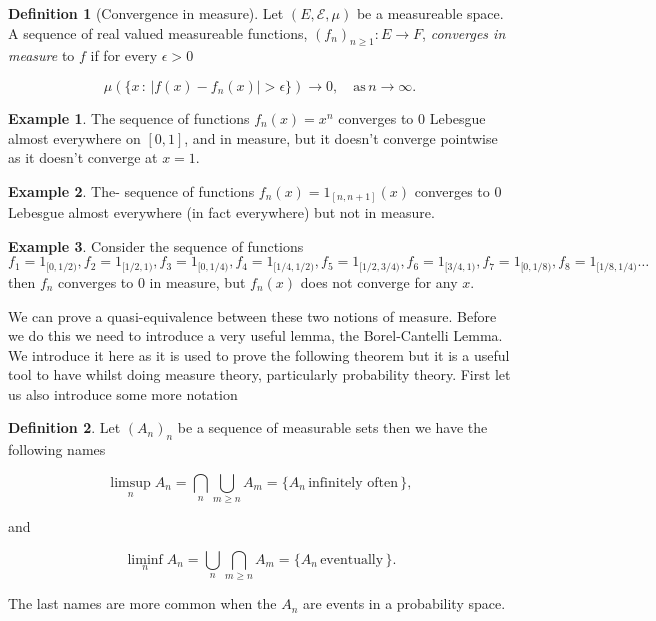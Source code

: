 \documentclass[
]{book}
\theoremstyle{definition}
\newtheorem{definition}{Definition}[chapter]
\theoremstyle{definition}
\newtheorem{example}{Example}[chapter]
\theoremstyle{definition}
\theoremstyle{definition}
\theoremstyle{remark}
\begin{document}
\begin{definition}[Convergence in measure]
Let \((E, \mathcal{E}, \mu)\) be a measureable space. A sequence of real valued measureable functions, \((f_n)_{n \geq 1}: E \rightarrow F\), \emph{converges in measure} to \(f\) if for every \(\epsilon > 0\)

\[ \mu \left( \{ x \, :\, |f(x) - f_n(x)| > \epsilon \} \right) \rightarrow 0, \quad \mbox{as}\, n \rightarrow \infty. \]
\end{definition}

\begin{example}
The sequence of functions \(f_n(x) = x^n\) converges to \(0\) Lebesgue almost everywhere on \([0,1]\), and in measure, but it doesn't converge pointwise as it doesn't converge at \(x=1\).
\end{example}

\begin{example}
The- sequence of functions \(f_n(x) = 1_{[n,n+1]}(x)\) converges to 0 Lebesgue almost everywhere (in fact everywhere) but not in measure.
\end{example}

\begin{example}
Consider the sequence of functions \(f_1 = 1_{[0,1/2)}, f_2 = 1_{[1/2, 1)}, f_3 = 1_{[0,1/4)}, f_4 = 1_{[1/4, 1/2)}, f_5= 1_{[1/2, 3/4)}, f_6 = 1_{[3/4,1)}, f_7 = 1_{[0,1/8)}, f_8 = 1_{[1/8, 1/4)} \dots\) then \(f_n\) converges to 0 in measure, but \(f_n(x)\) does not converge for any \(x\).
\end{example}

We can prove a quasi-equivalence between these two notions of measure. Before we do this we need to introduce a very useful lemma, the Borel-Cantelli Lemma. We introduce it here as it is used to prove the following theorem but it is a useful tool to have whilst doing measure theory, particularly probability theory. First let us also introduce some more notation

\begin{definition}
Let \((A_n)_n\) be a sequence of measurable sets then we have the following names

\[ \limsup_n A_n = \bigcap_n \bigcup_{m \geq n} A_m = \{ A_n \, \mbox{infinitely often}\,\}, \]

and

\[ \liminf_n A_n = \bigcup_n \bigcap_{m \geq n} A_m = \{ A_n \, \mbox{eventually}\,\}. \]

The last names are more common when the \(A_n\) are events in a probability space.
\end{definition}
\end{document}
